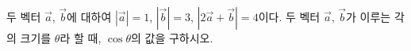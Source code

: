 두 벡터 $\vec{a}$, $\vec{b}$에 대하여 $|\vec{a}|=1$, $|\vec{b}|=3$, $|2\vec{a}+\vec{b}|=4$이다. 두 벡터 $\vec{a}$, $\vec{b}$가 이루는 각의 크기를 $\theta$라 할 때, $\cos\theta$의 값을 구하시오.
